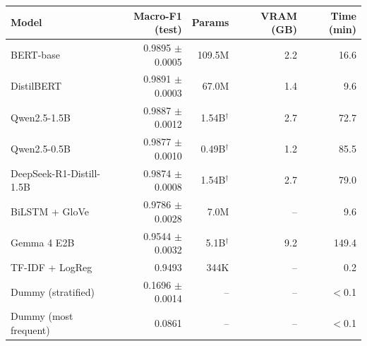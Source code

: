 \begin{tabular}{@{}lrrrr@{}}
\toprule
Model & Macro-F1 (test) & Params & VRAM (GB) & Time (min) \\
\midrule
BERT-base & 0.9895 $\pm$ 0.0005 & 109.5M & 2.2 & 16.6 \\
DistilBERT & 0.9891 $\pm$ 0.0003 & 67.0M & 1.4 & 9.6 \\
\midrule
Qwen2.5-1.5B & 0.9887 $\pm$ 0.0012 & 1.54B$^{\dagger}$ & 2.7 & 72.7 \\
Qwen2.5-0.5B & 0.9877 $\pm$ 0.0010 & 0.49B$^{\dagger}$ & 1.2 & 85.5 \\
DeepSeek-R1-Distill-1.5B & 0.9874 $\pm$ 0.0008 & 1.54B$^{\dagger}$ & 2.7 & 79.0 \\
\midrule
BiLSTM + GloVe & 0.9786 $\pm$ 0.0028 & 7.0M & -- & 9.6 \\
\midrule
Gemma 4 E2B & 0.9544 $\pm$ 0.0032 & 5.1B$^{\dagger}$ & 9.2 & 149.4 \\
\midrule
TF-IDF + LogReg & 0.9493 & 344K & -- & 0.2 \\
\midrule
Dummy (stratified) & 0.1696 $\pm$ 0.0014 & -- & -- & $<$0.1 \\
Dummy (most frequent) & 0.0861 & -- & -- & $<$0.1 \\
\bottomrule
\end{tabular}

